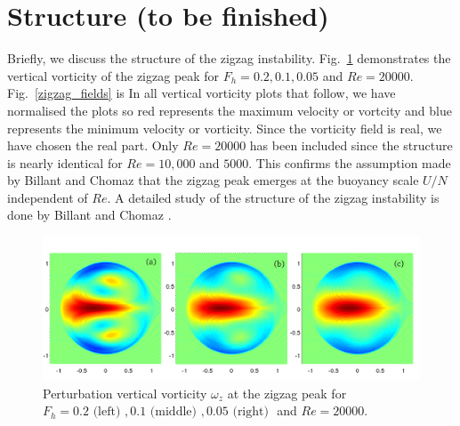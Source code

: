 \section{Structure (to be finished)} 
Briefly, we discuss the structure of the zigzag instability. Fig.~\ref{zigzag_vorticity} demonstrates the vertical vorticity of the zigzag peak for $F_{h}=0.2,0.1,0.05$ and $Re=20000$. Fig.~\ref{zigzag_fields} is In all vertical vorticity plots that follow, we have normalised the plots so red represents the maximum velocity or vortcity and blue represents the minimum velocity  or vorticity. Since the vorticity field is real, we have chosen the real part. Only $Re=20000$ has been included since the structure is nearly identical for $Re=10{,}000$ and $5000$. This confirms the assumption made by Billant and Chomaz \cite{bc2000b} that the zigzag peak emerges at the buoyancy scale $U/N$ independent of $Re$. A detailed study of the structure of the zigzag instability is done by Billant and Chomaz \cite{bc2000c}. 
\begin{figure} 
\begin{center}
\includegraphics[width=\textwidth]{vorticity_zigzag}
\caption{Perturbation vertical vorticity $\omega_{z}$ at the zigzag peak for $F_{h}=0.2 \text{ (left) }, 0.1 \text{ (middle) }, 0.05 \text{ (right) }$ and $Re=20000$.}
\label{zigzag_vorticity}
\end{center}
\end{figure} 
